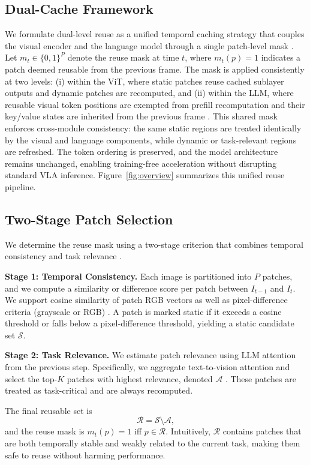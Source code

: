 \documentclass[11pt]{article}
\begin{document}
\subsection{Dual-Cache Framework}
We formulate dual-level reuse as a unified temporal caching strategy that couples the visual encoder and the language model through a single patch-level mask \citep{xu2025vla,liu2025ttf}. Let $m_t \in \{0,1\}^P$ denote the reuse mask at time $t$, where $m_t(p)=1$ indicates a patch deemed reusable from the previous frame. The mask is applied consistently at two levels: (i) within the ViT, where static patches reuse cached sublayer outputs and dynamic patches are recomputed, and (ii) within the LLM, where reusable visual token positions are exempted from prefill recomputation and their key/value states are inherited from the previous frame \citep{xu2025vla}. This shared mask enforces cross-module consistency: the same static regions are treated identically by the visual and language components, while dynamic or task-relevant regions are refreshed. The token ordering is preserved, and the model architecture remains unchanged, enabling training-free acceleration without disrupting standard VLA inference. Figure~\ref{fig:overview} summarizes this unified reuse pipeline.


\subsection{Two-Stage Patch Selection}
We determine the reuse mask using a two-stage criterion that combines temporal consistency and task relevance \citep{liu2025ttf,xu2025vla}.

\textbf{Stage 1: Temporal Consistency.} Each image is partitioned into $P$ patches, and we compute a similarity or difference score per patch between $I_{t-1}$ and $I_t$. We support cosine similarity of patch RGB vectors as well as pixel-difference criteria (grayscale or RGB) \citep{liu2025ttf}. A patch is marked static if it exceeds a cosine threshold or falls below a pixel-difference threshold, yielding a static candidate set $\mathcal{S}$.

\textbf{Stage 2: Task Relevance.} We estimate patch relevance using LLM attention from the previous step. Specifically, we aggregate text-to-vision attention and select the top-$K$ patches with highest relevance, denoted $\mathcal{A}$ \citep{xu2025vla}. These patches are treated as task-critical and are always recomputed.

The final reusable set is
\[
\mathcal{R} = \mathcal{S} \setminus \mathcal{A},
\]
and the reuse mask is $m_t(p)=1$ iff $p \in \mathcal{R}$. Intuitively, $\mathcal{R}$ contains patches that are both temporally stable and weakly related to the current task, making them safe to reuse without harming performance.
\end{document}
